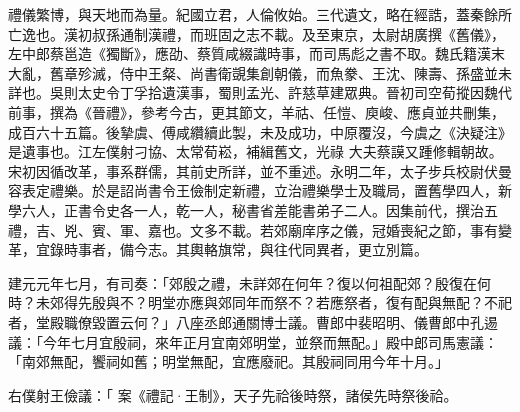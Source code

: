 
\begin{pinyinscope}

 禮儀繁博，與天地而為量。紀國立君，人倫攸始。三代遺文，略在經誥，蓋秦餘所亡逸也。漢初叔孫通制漢禮，而班固之志不載。及至東京，太尉胡廣撰《舊儀》，左中郎蔡邕造《獨斷》，應劭、蔡質咸綴識時事，而司馬彪之書不取。魏氏籍漢末大亂，舊章殄滅，侍中王粲、尚書衛覬集創朝儀，而魚豢、王沈、陳壽、孫盛並未詳也。吳則太史令丁孚拾遺漢事，蜀則孟光、許慈草建眾典。晉初司空荀摐因魏代前事，撰為《晉禮》，參考今古，更其節文，羊祜、任愷、庾峻、應貞並共刪集，成百六十五篇。後摯虞、傅咸纘續此製，未及成功，中原覆沒，今虞之《決疑注》是遺事也。江左僕射刁協、太常荀崧，補緝舊文，光祿
 大夫蔡謨又踵修輯朝故。宋初因循改革，事系群儒，其前史所詳，並不重述。永明二年，太子步兵校尉伏曼容表定禮樂。於是詔尚書令王儉制定新禮，立治禮樂學士及職局，置舊學四人，新學六人，正書令史各一人，乾一人，秘書省差能書弟子二人。因集前代，撰治五禮，吉、兇、賓、軍、嘉也。文多不載。若郊廟庠序之儀，冠婚喪紀之節，事有變革，宜錄時事者，備今志。其輿輅旗常，與往代同異者，更立別篇。



 建元元年七月，有司奏：「郊殷之禮，未詳郊在何年？復以何祖配郊？殷復在何時？未郊得先殷與不？明堂亦應與郊同年而祭不？若應祭者，復有配與無配？不祀者，堂殿職僚毀置云何？」八座丞郎通關博士議。曹郎中裴昭明、儀曹郎中孔逷議：「今年七月宜殷祠，來年正月宜南郊明堂，並祭而無配。」殿中郎司馬憲議：「南郊無配，饗祠如舊；明堂無配，宜應廢祀。其殷祠同用今年十月。」



 右僕射王儉議：「
 案《禮記·王制》，天子先祫後時祭，諸侯先時祭後祫。




\end{pinyinscope}
